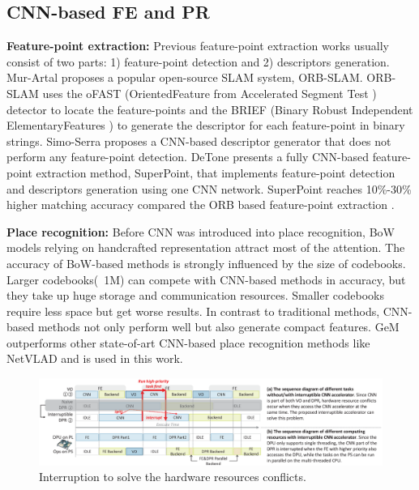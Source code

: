 \label{sec:relate}
\subsection{ CNN-based FE and PR }

\textbf{Feature-point extraction:} Previous feature-point extraction works usually consist of two parts: 1) feature-point detection and 2) descriptors generation.
Mur-Artal \cite{Mur-Artal:2017281} proposes a popular open-source SLAM system, ORB-SLAM. ORB-SLAM uses the oFAST (OrientedFeature from Accelerated Segment Test \cite{biadgie2014feature}) detector to locate the feature-points and the BRIEF (Binary Robust Independent ElementaryFeatures \cite{calonder2010brief}) to generate the descriptor for each feature-point in binary strings. 
Simo-Serra \cite{simo2015discriminative} proposes a CNN-based descriptor generator that does not perform any feature-point detection. 
DeTone \cite{detone2018superpoint} presents a fully CNN-based feature-point extraction method, SuperPoint, that implements feature-point detection and descriptors generation using one CNN network. SuperPoint\cite{detone2018superpoint} reaches 10\%-30\% higher matching accuracy compared the ORB based feature-point extraction \cite{Mur-Artal:2017281}.

\textbf{Place recognition:} Before CNN was introduced into place recognition, BoW \cite{small_1} models relying on handcrafted representation attract most of the attention. The accuracy of BoW-based methods is strongly influenced by the size of codebooks. Larger codebooks(~1M) \cite{large_1, large_2} can compete with CNN-based methods in accuracy, but they take up huge storage and communication resources. Smaller codebooks\cite{small_1, small_2} require less space but get worse results. In contrast to traditional methods, CNN-based methods not only perform well but also generate compact features. GeM \cite{radenovic2018fine} outperforms other state-of-art CNN-based place recognition methods like NetVLAD \cite{arandjelovic2016netvlad} and is used in this work.

\begin{figure}[t]
	\centering
	\includegraphics[width=0.99\linewidth]{fig/interDPR.eps}
    \caption{Interruption to solve the hardware resources conflicts.  
    }
	\label{fig:interDPR}
\end{figure}

